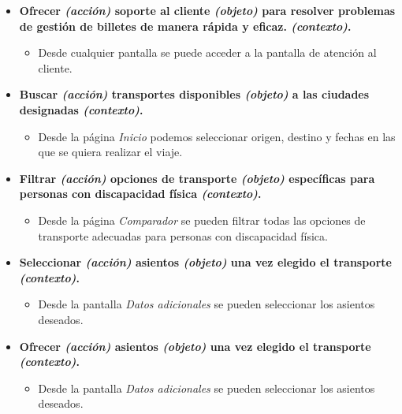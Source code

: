 \begin{itemize}
    \item \textbf{Ofrecer \textit{(acción)} soporte al cliente \textit{(objeto)} para resolver problemas de gestión de
        billetes de manera rápida y eficaz. \textit{(contexto)}.}
        \begin{itemize}
            \item Desde cualquier pantalla se puede acceder a la pantalla de atención al cliente.
        \end{itemize}

    \item \textbf{Buscar \textit{(acción)} transportes disponibles \textit{(objeto)} a las ciudades designadas \textit{(contexto)}.} 
        \begin{itemize}
            \item Desde la página \textit{Inicio} podemos seleccionar origen, destino y fechas en las que se quiera
                realizar el viaje.
        \end{itemize}

    \item \textbf{Filtrar \textit{(acción)} opciones de transporte \textit{(objeto)} específicas para personas con discapacidad
        física \textit{(contexto)}.}
        \begin{itemize}
            \item Desde la página \textit{Comparador} se pueden filtrar todas las opciones de transporte adecuadas para personas con
                discapacidad física.
        \end{itemize}

    \item \textbf{Seleccionar \textit{(acción)} asientos \textit{(objeto)} una vez elegido el transporte \textit{(contexto)}.}
        \begin{itemize}
            \item Desde la pantalla \textit{Datos adicionales} se pueden seleccionar los asientos deseados.
        \end{itemize}

    \item \textbf{Ofrecer \textit{(acción)} asientos \textit{(objeto)} una vez elegido el transporte \textit{(contexto)}.}
        \begin{itemize}
            \item Desde la pantalla \textit{Datos adicionales} se pueden seleccionar los asientos deseados.
        \end{itemize}


\end{itemize}
